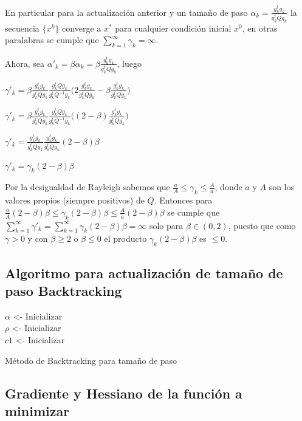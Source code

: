 \documentclass[conference]{IEEEtran}
\begin{document}
En particular para la actualización anterior y un tamaño de paso $\alpha_k = \frac{g^t_kg_k}{g^t_kQg_k}$
la secuencia $\{x^k\}$ converge a $x^*$ para cualquier condición inicial $x^0$, en otras paralabras
se cumple que $\sum_{k=1}^{\infty} \gamma_k = \infty$. \

Ahora, sea $\alpha\prime_k = \beta \alpha_k = \beta \frac{g^t_kg_k}{g^t_kQg_k}$, luego \

$\gamma\prime_k = \beta \frac{g^t_kg_k}{g^t_kQg_k} \frac{g_k^tQg_k}{g_k^tQ^{-1}g_k} \big(2\frac{g_k^tg_k}{g_k^tQg_k} - \beta \frac{g^t_kg_k}{g^t_kQg_k} \big)$ \

$\gamma\prime_k = \beta \frac{g^t_kg_k}{g^t_kQg_k} \frac{g_k^tQg_k}{g_k^tQ^{-1}g_k} \big((2 - \beta) \frac{g^t_kg_k}{g^t_kQg_k} \big)$ \

$\gamma\prime_k = \frac{g^t_kg_k}{g^t_kQg_k} \frac{g^t_kg_k}{g^t_kQg_k} (2 - \beta) \beta$ \

$\gamma\prime_k = \gamma_k (2 - \beta) \beta$ \

Por la desigualdad de Rayleigh sabemos que
$\frac{a}{A} \le \gamma_k \le \frac{A}{a}$, donde $a$ y $A$ son los valores
propios (siempre positivos) de $Q$. Entonces para
$\frac{a}{A} (2 - \beta) \beta \le \gamma_k (2 - \beta) \beta \le \frac{A}{a} (2 - \beta) \beta $
se cumple que
$\sum_{k=1}^{\infty} \gamma\prime_k = \sum_{k=1}^{\infty} \gamma_k (2 - \beta) \beta = \infty$
solo para $\beta \in (0, 2)$, puesto que como $\gamma > 0$ y con $\beta \ge 2$
o $\beta \le 0$ el producto $\gamma_k (2 - \beta) \beta$ es $\le 0$. \\


\subsection{Algoritmo para actualización de tamaño de paso Backtracking}

\begin{algorithm}[]
	\SetAlgoLined
	\KwResult{$\alpha$}
	$\alpha$ <- Inicializar \\
	$\rho$ <- Inicializar \\
	$c1$ <- Inicializar \\
	 \caption{Método de Backtracking para tamaño de paso}
\end{algorithm}


\subsection{Gradiente y Hessiano de la función a minimizar}
\end{document}

